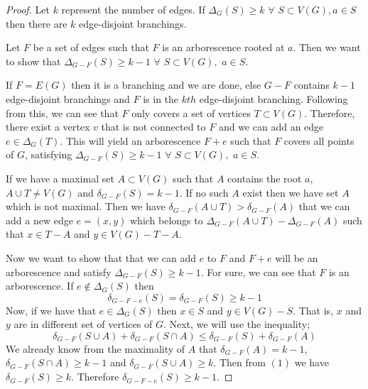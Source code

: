 \documentclass{article}
\begin{document}
\begin{proof}
Let $k$ represent the number of edges. If $\Delta_G(S) \ge k$ $\forall$ $S\subset V(G), a\in S$ then there are $k$ edge-disjoint branchings. 

Let $F$ be a set of edges such that $F$ is an arborescence rooted at $a$. Then we want to show that $\Delta_{G-F}(S) \ge k-1$ $\forall$ $S\subset V(G),$ $a\in S$.

If $F=E(G)$ then it is a branching and we are done, else $G-F$ contains $k-1$ edge-disjoint branchings and $F$ is in the $kth$ edge-disjoint branching. Following from this, we can see that $F$ only covers a set of vertices $T \subset V(G)$. Therefore, there exist a vertex $v$ that is not connected to $F$ and we can add an edge $e\in \Delta_G(T)$. This will yield an arborescence $F+e$ such that $F$ covers all points of $G$, satisfying $\Delta_{G-F}(S) \ge k-1$ $\forall$ $S\subset V(G),$ $a\in S$.

If we have a maximal set $A\subset V(G)$ such that $A$ contains the root $a$, $A \cup T \ne V(G)$ and $\delta_{G-F}(S) = k-1$. If no such $A$ exist then we have set $A$ which is not maximal. Then we have $\delta_{G-F}(A\cup T) > \delta_{G-F}(A)$ that we can add a new edge $e=(x,y)$ which belongs to $\Delta_{G-F}(A\cup T) - \Delta_{G-F}(A)$ such that $x\in T-A$ and $y\in V(G) -T-A$.

Now we want to show that that we can add $e$ to $F$ and $F+e$ will be an arborescence and satisfy $\Delta_{G-F}(S) \ge k-1$. For sure, we can see that $F$ is an arborescence. If $e\not\in \Delta_G(S)$ then $$\delta_{G-F-e}(S) = \delta_{G-F}(S) \ge k-1$$
Now, if we have that $e\in \Delta_G(S)$ then $x\in S$ and $y\in V(G)-S$. That is, $x$ and $y$ are in different set of vertices of $G$. Next, we will use the inequality; 
\begin{equation}\delta_{G-F}(S\cup A) + \delta_{G-F}(S\cap A) \le \delta_{G-F}(S) + \delta_{G-F}(A)\end{equation}
We already know from the maximality of $A$ that $\delta_{G-F}(A)=k-1$, $\delta_{G-F}(S\cap A) \ge k-1$ and $\delta_{G-F}(S\cup A) \ge k$. Then from $(1)$ we have $\delta_{G-F}(S) \ge k$. Therefore $\delta_{G-F-e}(S) \ge k-1$. 

\end{proof}
\end{document}
